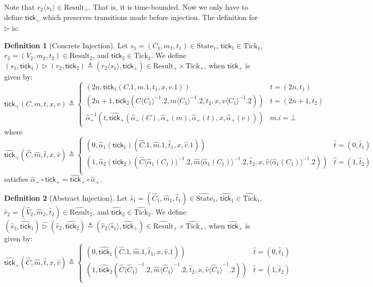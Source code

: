 \documentclass{article}
\theoremstyle{definition}
\newtheorem{definition}{Definition}[section]
\newcommand*{\A}[1]{\widehat{#1}}
\newcommand*{\mem}{m}
\newcommand*{\State}{\text{State}}
\newcommand*{\Result}{\text{Result}}
\newcommand*{\Tick}{\text{Tick}}
\newcommand*{\tick}{\mathsf{tick}}
\newcommand*{\inject}[2]{{#2}\langle{#1}\rangle}
\newcommand*{\delete}[2]{{#2}{\langle{#1}\rangle}^{-1}}
\begin{document}
Note that $\inject{s_1}{r_2}\in\Result_+$. That is, it is time-bounded.
Now we only have to define $\tick_+$ which preserves transitions made before injection.
The definition for $\rhd$ is:
\begin{definition}[Concrete Injection]
  Let $s_1=(C_1,\mem_1,t_1)\in\State_1$, $\tick_1\in\Tick_1$, $r_2=(V_2,\mem_2,t_2)\in\Result_2$, and $\tick_2\in\Tick_2$.
  We define $(s_1,\tick_1)\rhd(r_2,\tick_2)\triangleq(\inject{s_1}{r_2},\tick_+)\in\Result_+\times\Tick_+$, when $\tick_+$ is given by:
  \[
    \tick_+(C,\mem,t,x,v)\triangleq
    \begin{cases}
      (2n, \tick_1(C.1,\mem.1,t_1,x,v.1))                                                        & t=(2n,t_1)   \\
      (2n+1,\tick_2(\delete{C_1}{C}.2,\delete{C_1}{\mem}.2,t_2,x,\delete{C_1}{v}.2))             & t=(2n+1,t_2) \\
      \A\alpha_+^{-1}(t,\A\tick_+(\A\alpha_+(C),\A\alpha_+(\mem),\A\alpha_+(t),x,\A\alpha_+(v))) & \mem.i=\bot
    \end{cases}
  \]
  where
  \[
    \A\tick_+(\A{C},\A\mem,\A{t},x,\A{v})\triangleq
    \begin{cases}
      (0,\A\alpha_1(\tick_1)(\A{C}.1,\A\mem.1,\A{t}_1,x,\A{v}.1))                                                                                     & \A{t}=(0,\A{t}_1) \\
      (1,\A\alpha_2(\tick_2)(\delete{\A\alpha_1({C}_1)}{\A{C}}.2,\delete{\A\alpha_1({C}_1)}{\A\mem}.2,\A{t}_2,x,\delete{\A\alpha_1({C}_1)}{\A{v}}.2)) & \A{t}=(1,\A{t}_2) \\
    \end{cases}
  \]
  satisfies $\A\alpha_+\circ\tick_+=\A\tick_+\circ\A\alpha_+$.
\end{definition}

\begin{definition}[Abstract Injection]
  Let $\A{s}_1=(\A{C}_1,\A\mem_1,\A{t}_1)\in\A\State_1$, $\A\tick_1\in\A\Tick_1$, $\A{r}_2=(\A{V}_2,\A\mem_2,\A{t}_2)\in\A\Result_2$, and $\A\tick_2\in\A\Tick_2$.
  We define $(\A{s}_1,\A\tick_1)\A\rhd(\A{r}_2,\A\tick_2)\triangleq(\inject{\A{s}_1}{\A{r}_2},\A\tick_+)\in\A\Result_+\times\A\Tick_+$, when $\A\tick_+$ is given by:
  \[
    \A\tick_+(\A{C},\A\mem,\A{t},x,\A{v})\triangleq
    \begin{cases}
      (0,\A\tick_1(\A{C}.1,\A\mem.1,\A{t}_1,x,\A{v}.1))                                                       & \A{t}=(0,\A{t}_1) \\
      (1,\A\tick_2(\delete{\A{C}_1}{\A{C}}.2,\delete{\A{C}_1}{\A\mem}.2,\A{t}_2,x,\delete{\A{C}_1}{\A{v}}.2)) & \A{t}=(1,\A{t}_2) \\
    \end{cases}
  \]
\end{definition}
\end{document}

